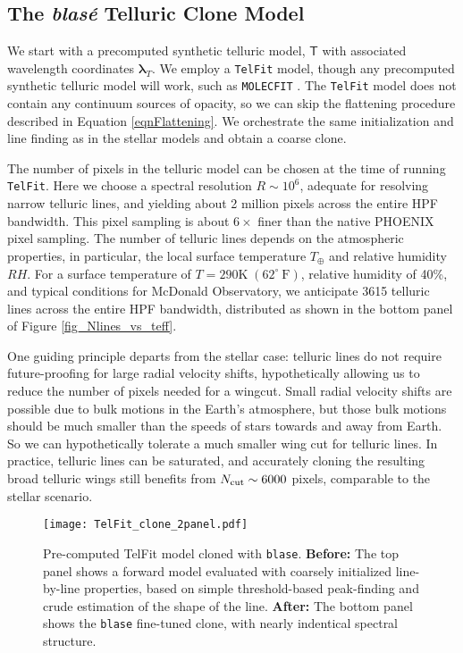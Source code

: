 \documentclass[trackchanges]{aastex631}
\begin{document}
\subsection{The  \emph{blas\'e} Telluric Clone Model}
We start with a precomputed synthetic telluric model, $\mathsf{T}$ with associated wavelength coordinates $\bm{\lambda}_T$.  We employ a \texttt{TelFit} model, though any precomputed synthetic telluric model will work, such as \texttt{MOLECFIT} \citep{2015A&A...576A..77S}.  The \texttt{TelFit} model does not contain any continuum sources of opacity, so we can skip the flattening procedure described in Equation \ref{eqnFlattening}.  We orchestrate the same initialization and line finding as in the stellar models and obtain a coarse clone.

The number of pixels in the telluric model can be chosen at the time of running \texttt{TelFit}.  Here we choose a spectral resolution $R\sim10^6$, adequate for resolving narrow telluric lines, and yielding about 2 million pixels across the entire HPF bandwidth.  This pixel sampling is about $6\times$ finer than the native PHOENIX pixel sampling.  The number of telluric lines depends on the atmospheric properties, in particular, the local surface temperature $T_\oplus$ and relative humidity $RH$.  For a surface temperature of $T=290 \mathrm{K}\; (62^\circ~\mathrm{F})$, relative humidity of 40\%, and typical conditions for McDonald Observatory, we anticipate 3615 telluric lines across the entire HPF bandwidth, distributed as shown in the bottom panel of Figure \ref{fig_Nlines_vs_teff}.

One guiding principle departs from the stellar case: telluric lines do not require future-proofing for large radial velocity shifts, hypothetically allowing us to reduce the number of pixels needed for a wingcut.  Small radial velocity shifts are possible due to bulk motions in the Earth's atmosphere, but those bulk motions should be much smaller than the speeds of stars towards and away from Earth.  So we can hypothetically tolerate a much smaller wing cut for telluric lines.  In practice, telluric lines can be saturated, and accurately cloning the resulting broad telluric wings still benefits from $N_{\rm cut}\sim6000$ pixels, comparable to the stellar scenario.

\begin{figure*}[hbt!]
    \centering
    \texttt{[image: TelFit\_clone\_2panel.pdf]}
    \caption{Pre-computed TelFit model cloned with \texttt{blase}.  \textbf{Before:} The top panel shows a forward model evaluated with coarsely initialized line-by-line properties, based on simple threshold-based peak-finding and crude estimation of the shape of the line.  \textbf{After:} The bottom panel shows the \texttt{blase} fine-tuned clone, with nearly indentical spectral structure.}
    \label{fig_telluric_clone}
\end{figure*}
\end{document}
